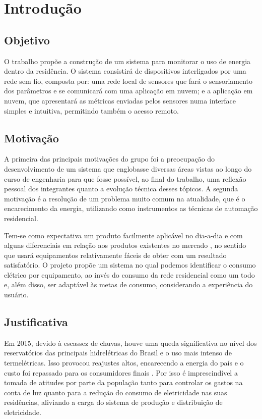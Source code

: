 \chapter{Introdução}
\label{Cap:Introducao}

\section{Objetivo}
\label{Sec:objetivo}

O trabalho propõe a construção de um sistema para monitorar o uso de energia dentro da residência. O sistema consistirá  de dispositivos interligados por uma rede sem fio, composta por: uma rede local de sensores  que fará o sensoriamento dos parâmetros e se comunicará com uma aplicação em nuvem; e a aplicação em nuvem, que apresentará as métricas enviadas pelos sensores numa interface simples e intuitiva, permitindo também o acesso remoto. 

\section{Motivação}
\label{Sec:motivacao}

A primeira das principais motivações do grupo foi a preocupação do desenvolvimento de um sistema que englobasse diversas áreas vistas ao longo do curso de engenharia para que fosse possível, ao final do trabalho, uma reflexão pessoal dos integrantes quanto a evolução técnica desses tópicos. A segunda motivação é a resolução de um problema muito comum na atualidade, que é o encarecimento da energia,  utilizando como instrumentos as técnicas de automação residencial.

Tem-se como expectativa um produto facilmente aplicável no dia-a-dia e com alguns diferenciais em relação aos produtos existentes no mercado \cite{green_ant_site} \cite{neurio_site} \cite{emonpi_site} \cite{ecoisme_site}, no sentido que usará equipamentos relativamente fáceis de obter com um resultado satisfatório. O projeto propõe um sistema no qual podemos identificar o consumo elétrico por equipamento, ao invés do consumo da rede residencial como um todo e, além disso, ser adaptável às metas de consumo, considerando a experiência do usuário.

\section{Justificativa}
\label{Sec:justificativa}

Em 2015, devido à escassez de chuvas, houve uma queda significativa no nível dos reservatórios das principais hidrelétricas do Brasil e o uso mais intenso de termelétricas. Isso provocou reajustes altos, encarecendo a energia do país e o custo foi repassado para os consumidores finais \cite{news_g1, news_secretaria_de_energia}. Por isso é imprescindível a tomada de atitudes por parte da população tanto para controlar os gastos na conta de luz quanto para a redução do consumo de eletricidade nas suas residências,  aliviando a carga do sistema de produção e distribuição de eletricidade.

